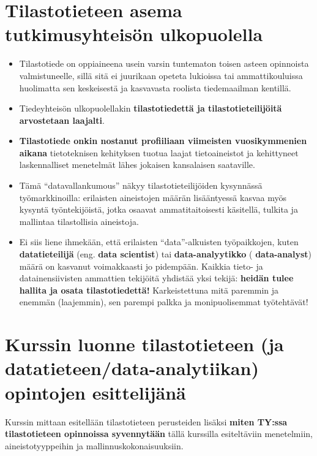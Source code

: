 \documentclass[
]{book}
\providecommand{\tightlist}{%
  \setlength{\itemsep}{0pt}\setlength{\parskip}{0pt}}
\begin{document}
\hypertarget{tilastotieteen-asema-tutkimusyhteisuxf6n-ulkopuolella}{%
\section{Tilastotieteen asema tutkimusyhteisön ulkopuolella}\label{tilastotieteen-asema-tutkimusyhteisuxf6n-ulkopuolella}}

\begin{itemize}
\tightlist
\item
  Tilastotiede on oppiaineena usein varsin tuntematon toisen asteen opinnoista valmistuneelle, sillä sitä ei juurikaan opeteta lukioissa tai ammattikouluissa huolimatta sen keskeisestä ja kasvavasta roolista tiedemaailman kentillä.
\item
  Tiedeyhteisön ulkopuolellakin \textbf{tilastotiedettä ja tilastotieteilijöitä arvostetaan laajalti}.
\item
  \textbf{Tilastotiede onkin nostanut profiiliaan viimeisten vuosikymmenien aikana} tietoteknisen kehityksen tuotua laajat tietoaineistot ja kehittyneet laskennalliset menetelmät lähes jokaisen kansalaisen saataville.
\item
  Tämä ``datavallankumous'' näkyy tilastotieteilijöiden kysynnässä työmarkkinoilla: erilaisten aineistojen määrän lisääntyessä kasvaa myös kysyntä työntekijöistä, jotka osaavat ammatitaitoisesti käsitellä, tulkita ja mallintaa tilastollisia aineistoja.
\item
  Ei siis liene ihmekään, että erilaisten ``data''-alkuisten työpaikkojen, kuten \textbf{datatieteilijä} (eng. \textbf{data scientist}) tai \textbf{data-analyytikko} ( \textbf{data-analyst}) määrä on kasvanut voimakkaasti jo pidempään. Kaikkia tieto- ja datainensiivisten ammattien tekijöitä yhdistää yksi tekijä: \textbf{heidän tulee hallita ja osata tilastotiedettä!} Karkeistettuna mitä paremmin ja enemmän (laajemmin), sen parempi palkka ja monipuolisemmat työtehtävät!
\end{itemize}

\hypertarget{kurssin-luonne-tilastotieteen-ja-datatieteendata-analytiikan-opintojen-esittelijuxe4nuxe4}{%
\section{Kurssin luonne tilastotieteen (ja datatieteen/data-analytiikan) opintojen esittelijänä}\label{kurssin-luonne-tilastotieteen-ja-datatieteendata-analytiikan-opintojen-esittelijuxe4nuxe4}}

Kurssin mittaan esitellään tilastotieteen perusteiden lisäksi \textbf{miten TY:ssa tilastotieteen opinnoissa syvennytään} tällä kurssilla esiteltäviin menetelmiin, aineistotyyppeihin ja mallinnuskokonaisuuksiin.
\end{document}
